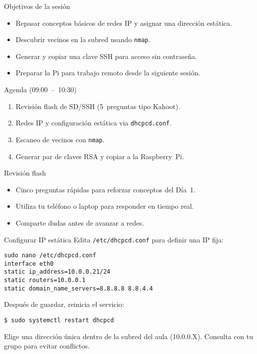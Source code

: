 \documentclass[aspectratio=169,professionalfonts]{beamer}
\begin{document}
\begin{frame}[fragile]{Objetivos de la sesión}
  \begin{itemize}
    \item Repasar conceptos básicos de redes IP y asignar una dirección estática.
    \item Descubrir vecinos en la subred usando \texttt{nmap}.
    \item Generar y copiar una clave SSH para acceso sin contraseña.
    \item Preparar la Pi para trabajo remoto desde la siguiente sesión.
  \end{itemize}
\end{frame}

\begin{frame}[fragile]{Agenda (09:00 – 10:30)}
  \begin{enumerate}
    \item Revisión flash de SD/SSH (5 preguntas tipo Kahoot).
    \item Redes IP y configuración estática via \texttt{dhcpcd.conf}.
    \item Escaneo de vecinos con \texttt{nmap}.
    \item Generar par de claves RSA y copiar a la Raspberry Pi.
  \end{enumerate}
\end{frame}

\begin{frame}[fragile]{Revisión flash}
  \begin{itemize}
    \item Cinco preguntas rápidas para reforzar conceptos del Día 1.
    \item Utiliza tu teléfono o laptop para responder en tiempo real.
    \item Comparte dudas antes de avanzar a redes.
  \end{itemize}
\end{frame}

\begin{frame}[fragile]{Configurar IP estática}
  Edita \texttt{/etc/dhcpcd.conf} para definir una IP fija:
  \begin{verbatim}
sudo nano /etc/dhcpcd.conf
interface eth0
static ip_address=10.0.0.21/24
static routers=10.0.0.1
static domain_name_servers=8.8.8.8 8.8.4.4
  \end{verbatim}
  Después de guardar, reinicia el servicio:
  \begin{verbatim}
$ sudo systemctl restart dhcpcd
  \end{verbatim}
  \begin{infobox}
  Elige una dirección única dentro de la subred del aula (10.0.0.X). Consulta con tu grupo para evitar conflictos.
  \end{infobox}
\end{frame}
\end{document}
